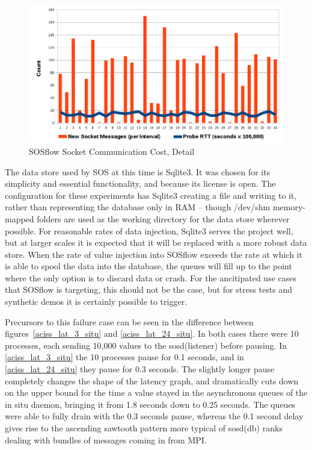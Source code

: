 \begin{figure}[!t]
\centering
\includegraphics[width=5in]{images/icebox_api_cost_zoom.png}
\caption{SOSflow Socket Communication Cost, Detail}
\label{sock_cost_detail}
\end{figure}

The data store used by SOS at this time is Sqlite3.
%
It was chosen for its simplicity and essential functionality, and
because its license is open.
%
The configuration for these experiments has Sqlite3 creating a file
and writing to it, rather than representing the database only in RAM
-- though /dev/shm memory-mapped folders are used as the working
directory for the data store wherever possible.
%
For reasonable rates of data injection, Sqlite3 serves the project
well, but at larger scales it is expected that it will be replaced
with a more robust data store.
%
When the rate of value injection into SOSflow exceeds the rate at
which it is able to spool the data into the database, the queues will
fill up to the point where the only option is to discard data or
crash.
%
For the ancitipated use cases that SOSflow is targeting, this should
not be the case, but for stress tests and synthetic demos it is
certainly possible to trigger.

Precursors to this failure case can be seen in the difference between
figures~\ref{aciss_lat_3_situ} and \ref{aciss_lat_24_situ}.
%
In both cases there were 10 processes, each sending 10,000 values to
the sosd(listener) before pausing.
%
In \ref{aciss_lat_3_situ} the 10 processes pause for 0.1 seconds, and
in \ref{aciss_lat_24_situ} they pause for 0.3 seconds.
%
The slightly longer pause completely changes the shape of the latency
graph, and dramatically cuts down on the upper bound for the time a
value stayed in the asynchronous queues of the in situ daemon,
bringing it from 1.8 seconds down to 0.25 seconds.
%
The queues were able to fully drain with the 0.3 seconds pause,
whereas the 0.1 second delay gives rise to the ascending sawtooth
pattern more typical of sosd(db) ranks dealing with bundles of
messages coming in from MPI.


